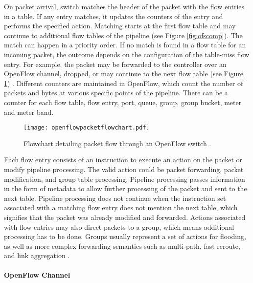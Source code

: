 On packet arrival, switch matches the header of the packet with the flow entries in a table. If any entry matches, it updates the counters of the entry and performs the specified action. Matching starts at the first flow table and may continue to additional flow tables of the pipeline (see Figure \ref{fig:ofscomp}). The match can happen in a priority order. If no match is found in a flow table for an incoming packet, the outcome depends on the configuration of the table-miss flow entry. For example, the packet may be forwarded to the controller over an OpenFlow channel, dropped, or may continue to the next flow table (see Figure \ref{fig:ofpacketflow}) \cite{openflowspecification13}. Different counters are maintained in OpenFlow, which count the number of packets and bytes at various specific points of the pipeline. There can be a counter for each flow table, flow entry, port, queue, group, group bucket, meter and meter band.

\begin{figure}[H]
\begin{center}
	{\texttt{[image: openflowpacketflowchart.pdf]}}
	\caption{Flowchart detailing packet flow through an OpenFlow switch \cite{openflowspecification13}.}
	\label{fig:ofpacketflow}
\end{center}
\end{figure}

Each flow entry consists of an instruction to execute an action on the packet or modify pipeline processing. The valid action could be packet forwarding, packet modification, and group table processing. Pipeline processing passes information in the form of metadata to allow further processing of the packet and sent to the next table. Pipeline processing does not continue when the instruction set associated with a matching flow entry does not mention the next table, which signifies that the packet was already modified and forwarded. Actions associated with flow entries may also direct packets to a group, which means additional processing has to be done. Groups usually represent a set of actions for flooding, as well as more complex forwarding semantics such as multi-path, fast reroute, and link aggregation \cite{openflowspecification13}.

\paragraph{OpenFlow Channel}\label{par:ofc}
